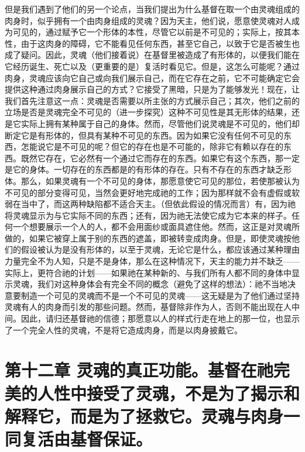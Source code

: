 但是我们遇到了他们的另一个论点，当我们提出为什么基督在取一个由灵魂组成的肉身时，似乎拥有一个由肉身组成的灵魂？因为天主，他们说，愿意使灵魂对人成为可见的，通过赋予它一个形体的本性，尽管它以前是不可见的；实际上，按其本性，由于这肉身的障碍，它不能看见任何东西，甚至它自己，以致于它是否被生也成了疑问。因此，灵魂（他们接着说）在基督里被造成了有形体的，以便我们能在它经历诞生、死亡以及（更重要的是）复活时看见它。但是，这怎么可能呢？通过肉身，灵魂应该向它自己或向我们展示自己，而在它存在之前，它不可能确定它会提供这种通过肉身展示自己的方式？它接受了黑暗，只是为了能够发光！现在，让我们首先注意这一点：灵魂是否需要以所主张的方式展示自己；其次，他们之前的立场是否是灵魂完全不可见的（进一步探究）这种不可见性是其无形体的结果，还是它实际上拥有某种属于自己的身体。然而，尽管他们说灵魂是不可见的，他们却断定它是有形体的，但具有某种不可见的东西。因为如果它没有任何不可见的东西，怎能说它是不可见的呢？但它的存在也是不可能的，除非它有赖以存在的东西。既然它存在，它必然有一个通过它而存在的东西。如果它有这个东西，那一定是它的身体。一切存在的东西都是的有形体的存在。只有不存在的东西才缺乏形体。那么，如果灵魂有一个不可见的身体，那愿意使它可见的那位，若使那被认为不可见的部分变得可见，当然会更好地完成祂的工作；因为那样就不会有虚假或软弱在当中了，而这两种缺陷都不适合天主。（但依此假设的情况而言）有，因为祂将灵魂显示为与它实际不同的东西；还有，因为祂无法使它成为它本来的样子。任何一个想要展示一个人的人，都不会用面纱或面具遮住他。然而，这正是对灵魂所做的，如果它被穿上属于别的东西的遮盖，即被转变成肉身。但是，即使灵魂按他们的假设被认为是没有形体的，以至于灵魂，无论它是什么，都应该通过某种理由力量完全不为人知，只是不是身体，那么在这种情况下，天主的能力并不缺乏——实际上，更符合祂的计划——如果祂在某种新的、与我们所有人都不同的身体中显示灵魂，我们对这种身体会有完全不同的概念（避免了这样的想法）：祂不当地决意要制造一个可见的灵魂而不是一个不可见的灵魂——这无疑是为了他们通过坚持灵魂有人的肉身而引发的那些问题。然而，基督除非作为人，否则不能出现在人中间。因此，请归还基督祂的信德；那愿意以人的样式行走在地上的那一位，也显示了一个完全人性的灵魂，不是将它造成肉身，而是以肉身披戴它。\par


\section{第十二章 灵魂的真正功能。基督在祂完美的人性中接受了灵魂，不是为了揭示和解释它，而是为了拯救它。灵魂与肉身一同复活由基督保证。}


